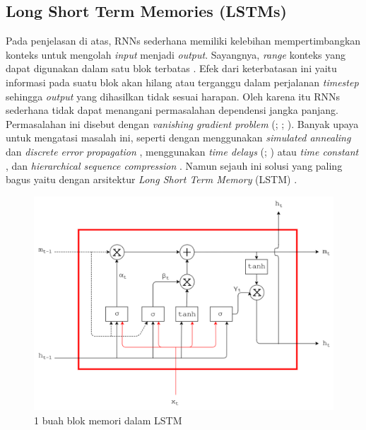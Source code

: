 \subsection{Long Short Term Memories (LSTMs)}\label{subbab:lstm}
Pada penjelasan di atas, RNNs sederhana memiliki kelebihan mempertimbangkan konteks untuk mengolah \textit{input} menjadi \textit{output}. Sayangnya, \textit{range} konteks yang dapat digunakan dalam satu blok terbatas \citep{graves2012neural}. Efek dari keterbatasan ini yaitu informasi pada suatu blok akan hilang atau terganggu dalam perjalanan \textit{timestep} sehingga \textit{output} yang dihasilkan tidak sesuai harapan. Oleh karena itu RNNs sederhana tidak dapat menangani permasalahan dependensi jangka panjang. Permasalahan ini disebut dengan \textit{vanishing gradient problem} (\cite{hochreiter1991untersuchungen}; \cite{hochreiter2001gradient}; \cite{bengio1994learning}). Banyak upaya untuk mengatasi masalah ini, seperti dengan menggunakan \textit{simulated annealing} dan \textit{discrete error propagation} \citep{bengio1994learning}, menggunakan \textit{time delays} (\cite{lang1990time}; \cite{bakker2001reinforcement}) atau \textit{time constant} \citep{ieee1997advances}, dan \textit{hierarchical sequence compression} \citep{schmidhuber2007training}. Namun sejauh ini solusi yang paling bagus yaitu dengan arsitektur \textit{Long Short Term Memory} (LSTM) \citep{hochreiter1997long}.

\begin{figure}
	\centering
	\includegraphics[width=1.0\linewidth]{images/lstm}
	\caption{1 buah blok memori dalam LSTM}
	\label{fig:lstm}
\end{figure}

